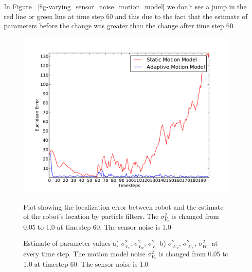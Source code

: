 \documentclass[12pt]{dalcsthesis}
\begin{document}
In Figure ~\ref{fig-varying_sensor_noise_motion_model} we don't see a jump in the red line or green line at time step 60 and this due to the fact that the estimate of parameters before the change was greater than the change after time step 60. 

\begin{figure}[!h]
  \centering
     {\includegraphics[height = 3.0 in]{./plots/200_005_10_s_10.pdf}}
  \caption{\label{fig-varying_sensor_noise_1.0} Plot showing the localization error between robot and the estimate of the robot's location by particle filters. The $\sigma_{V_{v}}^{2}$ is changed from 0.05 to 1.0 at timestep 60. The sensor noise is 1.0}
\end{figure}

\begin{figure}[!h]
  \centering
     \qquad
  \caption{\label{fig-varying_sensor_noise_motion_model_1.0} Estimate of parameter values a) $\sigma_{V_{v}}^{2}$, $\sigma_{V_{w}}^{2}$,  $\sigma_{V_{1}}^{2}$ b)  $\sigma_{W_{v}}^{2}$, $\sigma_{W_{w}}^{2}$, $\sigma_{W_{1}}^{2}$ at every time step. The motion model noise $\sigma_{V_{v}}^{2}$ is changed from 0.05 to 1.0 at timestep 60. The sensor noise is 1.0}
\end{figure}  
\end{document}
